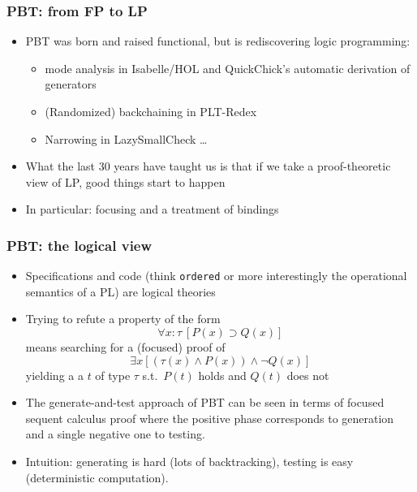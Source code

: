 \documentclass{beamer}
\newcommand{\red}[1]{{\color{red} #1}}
\newenvironment{myslide}[1]
    {\begin{frame}\frametitle{#1}}
    {\end{frame}}
\begin{document}
\begin{myslide}{PBT: from FP to LP}
  \begin{itemize}
  \item PBT  was born and raised functional, but is rediscovering logic programming:
    \begin{itemize}
    \item mode analysis in Isabelle/HOL and QuickChick's automatic derivation of 
        generators
    \item (Randomized) backchaining in PLT-Redex
    \item Narrowing in LazySmallCheck \dots

    \end{itemize}
  \pause
  \item What the last 30 years have taught us is that if we take a
    \red{proof-theoretic} view of LP, good things start to happen
  \item In particular: \red{focusing} and a \red{treatment of
      bindings}
 
  \end{itemize}
\end{myslide}
\begin{frame}
  \frametitle{PBT: the logical view}
  \begin{itemize}
  \item Specifications and code (think \texttt{ordered} or more interestingly the operational semantics of a PL) are logical theories 
  \pause
  \item Trying to refute a property of the form
    \[\forall x\colon\tau\ [P(x) \supset Q(x)]\] means searching for a (focused) proof of
    \[\exists x [(\tau(x)\land P(x)) \land \neg Q(x)]\] yielding a
    a $t$ of type $\tau$ s.t.\ $P(t)$ holds and $Q(t)$ does not \pause
  \item The generate-and-test approach of PBT can be seen in terms of
    focused sequent calculus proof where the \red{positive} phase
    corresponds to generation and a single \red{negative} one to
    testing.
  \item Intuition: generating is hard (lots of backtracking), testing is easy (deterministic computation).
  \end{itemize}
\end{frame}
\end{document}
